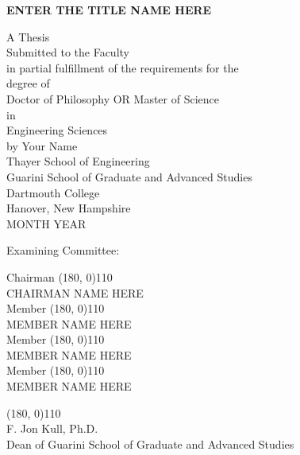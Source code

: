 \pagestyle{plain}
\begin{center}
\textbf{ENTER THE TITLE NAME HERE}
\vspace{0.4cm}

A Thesis\\
Submitted to the Faculty \\
in partial fulfillment of the requirements for the \\
degree of \\[0.4cm]
Doctor of Philosophy OR Master of Science \\[0.4cm]
in\\[0.4cm]
Engineering Sciences\\[0.4cm]
by Your Name\\[0.5cm]
Thayer School of Engineering \\
Guarini School of Graduate and Advanced Studies\\
Dartmouth College \\
Hanover, New Hampshire \\[0.4cm]
MONTH YEAR %
\vspace{0.5cm}

\end{center}

Examining Committee:

\begin{flushright}
Chairman \line(180, 0){110} \\
CHAIRMAN NAME HERE\\[1cm]

Member \line(180, 0){110} \\
MEMBER NAME HERE \\[1cm]

Member \line(180, 0){110} \\
MEMBER NAME HERE \\[1cm]

Member \line(180, 0){110} \\
MEMBER NAME HERE\\[1cm]


\end{flushright}

\begin{flushleft}
\line(180, 0){110} \\
F. Jon Kull, Ph.D.\\
Dean of Guarini School of Graduate and Advanced Studies\\[1cm]
\end{flushleft}






